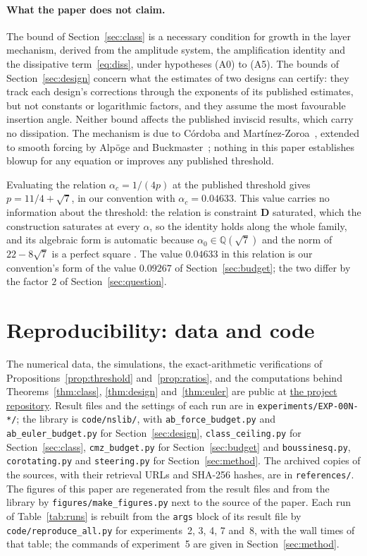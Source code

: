 \documentclass[11pt]{article}
\theoremstyle{remark}
\newcommand{\Q}{\mathbb Q}
\newcommand{\ev}[1]{\hspace{0.2em}{\small\textsf{[#1]}}}
\newcommand{\recordurl}{https://github.com/fsantibanezleal/CAOS_RESEARCH/tree/main/problems/analysis-pde/navier-stokes}
\newcommand{\fp}[1]{\nolinkurl{#1}}
\begin{document}
\paragraph{What the paper does not claim.} The bound of Section~\ref{sec:class} is a necessary condition for growth in the layer mechanism,
derived from the amplitude system, the amplification identity and the dissipative
term~\eqref{eq:diss}, under hypotheses (A0) to (A5). The bounds of Section~\ref{sec:design} concern what the estimates of two designs
can certify: they track each design's corrections through the exponents of its published estimates,
but not constants or logarithmic factors, and they assume the most favourable insertion angle. Neither
bound affects the published inviscid results, which carry no dissipation. The mechanism is due to C\'ordoba
and Mart\'inez-Zoroa~\cite{clsmz,cmz}, extended to smooth forcing by Alp\"oge and
Buckmaster~\cite{ab-boussinesq,ab-euler,ab-ipm}; nothing in this paper
establishes blowup for any equation or improves any published threshold.

Evaluating the relation $\alpha_{c}=1/(4p)$ at the published threshold gives $p=11/4+\sqrt7$, in our
convention with $\alpha_{c}=0.04633$. This
value carries no information about the threshold: the relation is constraint \textbf{D} saturated,
which the construction saturates at every $\alpha$, so the identity holds along the whole family,
and its algebraic form is automatic because $\alpha_{0}\in\Q(\sqrt7)$ and the norm of
$22-8\sqrt7$ is a perfect square \ev{D}. The value $0.04633$ in this relation is our convention's form of the value
$0.09267$ of Section~\ref{sec:budget}; the two differ by the factor $2$ of Section~\ref{sec:question}.

\section{Reproducibility: data and code}\label{sec:reproducibility}

The numerical data, the simulations, the exact-arithmetic verifications of
Propositions~\ref{prop:threshold} and~\ref{prop:ratios}, and the computations behind
Theorems~\ref{thm:class}, \ref{thm:design} and~\ref{thm:euler} are public at \href{\recordurl}{the project repository}.
Result files and the settings of each run are in \fp{experiments/EXP-00N-*/}; the library is
\fp{code/nslib/}, with \fp{ab_force_budget.py} and \fp{ab_euler_budget.py} for
Section~\ref{sec:design}, \fp{class_ceiling.py} for Section~\ref{sec:class},
\fp{cmz_budget.py} for Section~\ref{sec:budget} and \fp{boussinesq.py}, \fp{corotating.py}
and \fp{steering.py} for Section~\ref{sec:method}. The archived copies of the sources, with their
retrieval URLs and SHA-256 hashes, are in \fp{references/}. The figures of this paper are
regenerated from the result files and from the library by \fp{figures/make_figures.py} next to the source of the paper.
Each run of Table~\ref{tab:runs} is rebuilt from the \fp{args} block of its result file by \fp{code/reproduce_all.py}
for experiments~2, 3, 4, 7 and~8, with the wall times of that table; the commands of experiment~5 are given in
Section~\ref{sec:method}.
\end{document}
